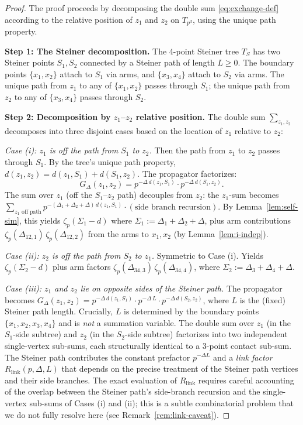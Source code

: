 \documentclass[11pt,a4paper]{article}
\begin{document}
\begin{proof}
The proof proceeds by decomposing the double sum \eqref{eq:exchange-def} according to the relative position of $z_1$ and $z_2$ on $T_{p^d}$, using the unique path property.

\textbf{Step 1: The Steiner decomposition.} The 4-point Steiner tree $T_S$ has two Steiner points $S_1, S_2$ connected by a Steiner path of length $L \geq 0$. The boundary points $\{x_1, x_2\}$ attach to $S_1$ via arms, and $\{x_3, x_4\}$ attach to $S_2$ via arms. The unique path from $z_1$ to any of $\{x_1, x_2\}$ passes through $S_1$; the unique path from $z_2$ to any of $\{x_3, x_4\}$ passes through $S_2$.

\textbf{Step 2: Decomposition by $z_1$--$z_2$ relative position.} The double sum $\sum_{z_1, z_2}$ decomposes into three disjoint cases based on the location of $z_1$ relative to $z_2$:

\emph{Case (i): $z_1$ is off the path from $S_1$ to $z_2$.} Then the path from $z_1$ to $z_2$ passes through $S_1$. By the tree's unique path property, $d(z_1, z_2) = d(z_1, S_1) + d(S_1, z_2)$. The propagator factorizes:
\begin{equation}
G_\Delta(z_1, z_2) = p^{-\Delta\,d(z_1, S_1)} \cdot p^{-\Delta\,d(S_1, z_2)}.
\end{equation}
The sum over $z_1$ (off the $S_1$--$z_2$ path) decouples from $z_2$: the $z_1$-sum becomes $\sum_{z_1 \text{ off path}} p^{-(\Delta_1+\Delta_2+\Delta)\,d(z_1, S_1)} \cdot (\text{side branch recursion})$. By Lemma~\ref{lem:self-sim}, this yields $\zeta_p(\Sigma_1 - d)$ where $\Sigma_1 := \Delta_1 + \Delta_2 + \Delta$, plus arm contributions $\zeta_p(\Delta_{12,1})\,\zeta_p(\Delta_{12,2})$ from the arms to $x_1, x_2$ (by Lemma~\ref{lem:i-indep}).

\emph{Case (ii): $z_2$ is off the path from $S_2$ to $z_1$.} Symmetric to Case (i). Yields $\zeta_p(\Sigma_2 - d)$ plus arm factors $\zeta_p(\Delta_{34,3})\,\zeta_p(\Delta_{34,4})$, where $\Sigma_2 := \Delta_3 + \Delta_4 + \Delta$.

\emph{Case (iii): $z_1$ and $z_2$ lie on opposite sides of the Steiner path.} The propagator becomes $G_\Delta(z_1, z_2) = p^{-\Delta\,d(z_1, S_1)} \cdot p^{-\Delta\,L} \cdot p^{-\Delta\,d(S_2, z_2)}$, where $L$ is the (fixed) Steiner path length. Crucially, $L$ is determined by the boundary points $\{x_1, x_2, x_3, x_4\}$ and is \emph{not} a summation variable. The double sum over $z_1$ (in the $S_1$-side subtree) and $z_2$ (in the $S_2$-side subtree) factorizes into two independent single-vertex sub-sums, each structurally identical to a 3-point contact sub-sum. The Steiner path contributes the constant prefactor $p^{-\Delta L}$ and a \emph{link factor} $R_{\mathrm{link}}(p, \Delta, L)$ that depends on the precise treatment of the Steiner path vertices and their side branches. The exact evaluation of $R_{\mathrm{link}}$ requires careful accounting of the overlap between the Steiner path's side-branch recursion and the single-vertex sub-sums of Cases (i) and (ii); this is a subtle combinatorial problem that we do not fully resolve here (see Remark~\ref{rem:link-caveat}).


\end{proof}
\end{document}

